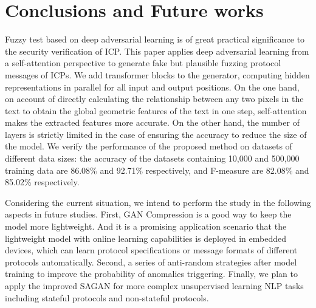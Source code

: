 \section{Conclusions and Future works}

Fuzzy test based on deep adversarial learning is of great practical significance to the security verification of ICP. This paper applies deep adversarial learning from a self-attention perspective to generate fake but plausible fuzzing protocol messages of ICPs. We add transformer blocks to the generator, computing hidden representations in parallel for all input and output positions. On the one hand, on account of directly calculating the relationship between any two pixels in the text to obtain the global geometric features of the text in one step, self-attention makes the extracted features more accurate. On the other hand, the number of layers is strictly limited in the case of ensuring the accuracy to reduce the size of the model. We verify the performance of the proposed method on datasets of different data sizes: the accuracy of the datasets containing 10,000 and 500,000 training data are 86.08\% and 92.71\% respectively, and F-measure are 82.08\% and 85.02\% respectively.


Considering the current situation, we intend to perform the study in the following aspects in future studies. First, GAN Compression \cite{li2020gan} is a good way to keep the model more lightweight. And it is a promising application scenario that the lightweight model with online learning capabilities is deployed in embedded devices, which can learn protocol specifications or message formats of different protocols automatically. Second, a series of anti-random strategies after model training to improve the probability of anomalies triggering. Finally, we plan to apply the improved SAGAN for more complex unsupervised learning NLP tasks including stateful protocols and non-stateful protocols. 


